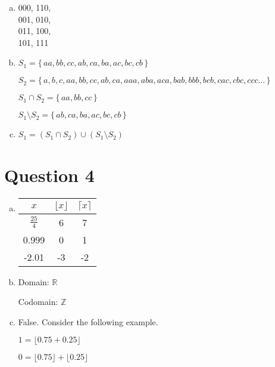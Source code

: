 \documentclass[12pt]{article}
\begin{document}
\begin{enumerate}[a)]
    \item
        000, 110,\\
        001, 010,\\
        011, 100,\\
        101, 111

    \bigskip

    \item
        $S_1 = \{\,aa,bb,cc,ab,ca,ba,ac,bc,cb\,\}$

        $S_2 = \{\,a,b,c,aa,bb,cc,ab,ca,aaa,aba,aca,bab,bbb,bcb,cac,cbc,ccc\dots\,\}$

        \bigskip

        $S_1 \cap S_2 = \{\,aa,bb,cc\,\}$

        $S_1 \setminus S_2 = \{\,ab,ca,ba,ac,bc,cb\,\}$

    \bigskip

    \item
        $S_1 = (S_1 \cap S_2) \cup (S_1 \setminus S_2)$
\end{enumerate}


\section*{Question 4}

\begin{enumerate}[a)]
    \item
        \begin{tabular}{ c | c | c }
            $x$ & $\lfloor x \rfloor$ & $\lceil x \rceil$ \\
            \hline
            $\frac{25}{4}$ & 6 & 7 \\
            \hline
            0.999 & 0 & 1 \\
            \hline
            -2.01 & -3 & -2 \\
            \hline
        \end{tabular}


    \bigskip

    \item
        Domain: $\mathbb{R}$

        Codomain: $\mathbb{Z}$

    \bigskip

    \item
        False. Consider the following example.

        $1 =  \lfloor 0.75 + 0.25 \rfloor$

        $0 = \lfloor 0.75 \rfloor  + \lfloor 0.25 \rfloor$

\end{enumerate}
\end{document}
